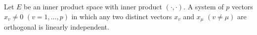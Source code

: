 Let $E$ be an inner product space with inner product $(\cdot, \cdot)$. A system of $p$ vectors $x_v \neq 0$ $(v = 1, \ldots, p)$ in which any two distinct vectors $x_v$ and $x_\mu$ $(v \neq \mu)$ are orthogonal is linearly independent.

